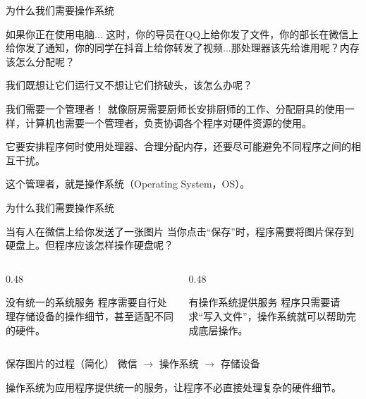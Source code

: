 \documentclass[aspectratio=169]{beamer}
\begin{document}
\begin{frame}{为什么我们需要操作系统}
\begin{block}{如果你正在使用电脑...}
\hspace*{2em}这时，你的导员在QQ上给你发了文件，你的部长在微信上给你发了通知，你的同学在抖音上给你转发了视频...那处理器该先给谁用呢？内存该怎么分配呢？

\par\hspace*{2em}我们既想让它们运行又不想让它们挤破头，该怎么办呢？
\end{block}
\pause
\begin{block}{我们需要一个管理者！}
\hspace*{2em}就像厨房需要厨师长安排厨师的工作、分配厨具的使用一样，计算机也需要一个管理者，负责协调各个程序对硬件资源的使用。

\par\hspace*{2em}它要安排程序何时使用处理器、合理分配内存，还要尽可能避免不同程序之间的相互干扰。

\par\hspace*{2em}\alert{这个管理者，就是操作系统（Operating System，OS）。}
\end{block}
\end{frame}

\begin{frame}{为什么我们需要操作系统}
	
	\begin{block}{当有人在微信上给你发送了一张图片}
		\hspace*{2em}当你点击“保存”时，程序需要将图片保存到硬盘上。但程序应该怎样操作硬盘呢？
	\end{block}
	\pause
	\begin{columns}[T,onlytextwidth]
		\begin{column}{0.48\textwidth}
			\begin{block}{没有统一的系统服务}
				程序需要自行处理存储设备的操作细节，甚至适配不同的硬件。
			\end{block}
		\end{column}
		
		\begin{column}{0.48\textwidth}
			\begin{block}{有操作系统提供服务}
				程序只需要请求“写入文件”，操作系统就可以帮助完成底层操作。
			\end{block}
		\end{column}
	\end{columns}
	
	\begin{block}{保存图片的过程（简化）}
		\centering
		微信
		$\longrightarrow$
		操作系统
		$\longrightarrow$
		存储设备
	\end{block}
	
	\vspace{0.3cm}
	
	\begin{center}
		\alert{操作系统为应用程序提供统一的服务，让程序不必直接处理复杂的硬件细节。}
	\end{center}
	
\end{frame}
\end{document}
